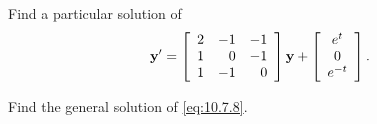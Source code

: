 \begin{example}
  \label{example:10.7.4} \rm \mbox{}
  \newline
  \begin{alist}
    \item %
    Find a particular solution of
    \begin{equation}
      \label{eq:10.7.8}{\bf y}'=\left[\begin{array}{rrr} 2&-1&-1\\1&0&-1\\1&-1&0\end{array}\right]{\bf y}+\left[
      \begin{array}{c}
        e^{t}  \\
        0      \\
        e^{-t}
      \end{array}\right].
    \end{equation}

    \item %
    Find the general solution of \eqref{eq:10.7.8}.
  \end{alist}
\end{example}

